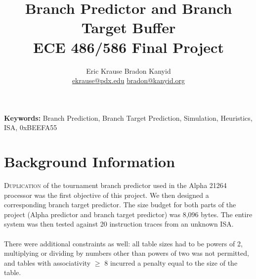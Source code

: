 \documentclass[twocolumn]{article}
\title{\textbf{Branch Predictor and Branch Target Buffer} \\
ECE 486/586 Final Project }
\author{Eric Krause \hspace{1.4in} Bradon Kanyid\\
\url{ekrause@pdx.edu} \hspace{1in} \url{bradon@kanyid.org}}
\begin{document}
\twocolumn[
  \begin{@twocolumnfalse}
    \maketitle
    \begin{abstract}
      ...
    \end{abstract}
  \end{@twocolumnfalse}
]
\textbf{Keywords:} Branch Prediction, Branch Target Prediction, Simulation, Heuristics, ISA, 0xBEEFA55

\section{Background Information}
\lettrine{D}{uplication} of the tournament branch predictor used in the Alpha 21264 processor was the first objective of this project.  We then designed a corresponding branch target predictor.  The size budget for both parts of the project (Alpha predictor and branch target predictor) was 8,096 bytes.  The entire system was then tested against 20 instruction traces from an unknown ISA. \\\\
There were additional constraints as well: all table sizes had to be powers of 2, multiplying or dividing by numbers other than powers of two was not permitted, and tables with associativity $\ge$ 8 incurred a penalty equal to the size of the table.\\\\
\end{document}
